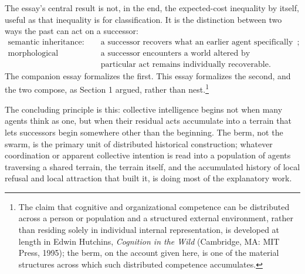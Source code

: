 \documentclass[11pt]{article}
\begin{document}
The essay's central result is not, in the end, the expected-cost inequality by itself, useful as that inequality is for classification. It is the distinction between two ways the past can act on a successor:
\[
\begin{aligned}
\text{semantic inheritance:}\quad&
\text{a successor recovers what an earlier agent specifically recorded};\\
\text{morphological inheritance:}\quad&
\text{a successor encounters a world altered by accumulated acts, whether or not any}\\
&\text{particular act remains individually recoverable}.
\end{aligned}
\]
The companion essay formalizes the first. This essay formalizes the second, and the two compose, as Section 1 argued, rather than nest.\footnote{The claim that cognitive and organizational competence can be distributed across a person or population and a structured external environment, rather than residing solely in individual internal representation, is developed at length in Edwin Hutchins, \emph{Cognition in the Wild} (Cambridge, MA: MIT Press, 1995); the berm, on the account given here, is one of the material structures across which such distributed competence accumulates.}

The concluding principle is this: collective intelligence begins not when many agents think as one, but when their residual acts accumulate into a terrain that lets successors begin somewhere other than the beginning. The berm, not the swarm, is the primary unit of distributed historical construction; whatever coordination or apparent collective intention is read into a population of agents traversing a shared terrain, the terrain itself, and the accumulated history of local refusal and local attraction that built it, is doing most of the explanatory work.
\end{document}
